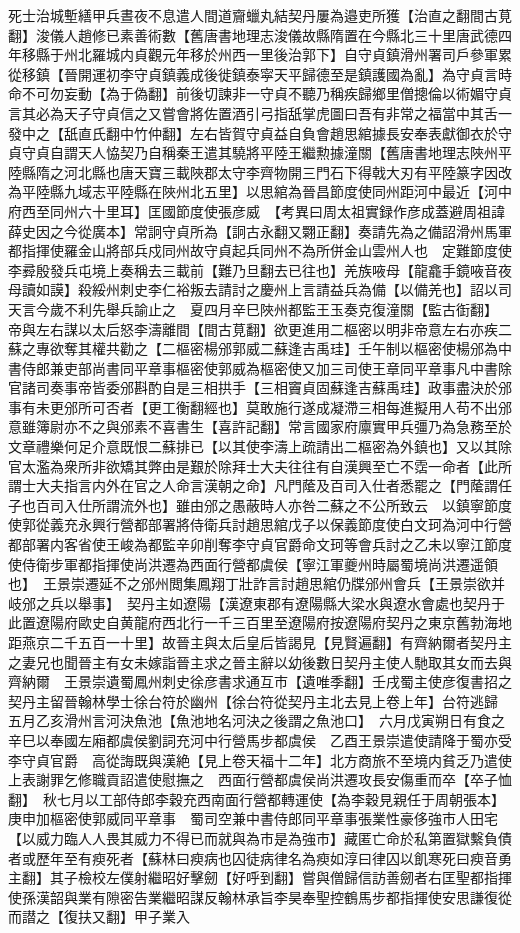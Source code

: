 死士治城塹繕甲兵晝夜不息遣人間道齎蠟丸結契丹屢為邉吏所獲【治直之翻間古莧翻】浚儀人趙修已素善術數【舊唐書地理志浚儀故縣隋置在今縣北三十里唐武德四年移縣于州北羅城内貞觀元年移於州西一里後治郭下】自守貞鎮滑州署司戶參軍累從移鎮【晉開運初李守貞鎮義成後徙鎮泰寜天平歸德至是鎮護國為亂】為守貞言時命不可勿妄動【為于偽翻】前後切諫非一守貞不聽乃稱疾歸鄉里僧摠倫以術媚守貞言其必為天子守貞信之又嘗會將佐置酒引弓指舐掌虎圖曰吾有非常之福當中其舌一發中之【舐直氏翻中竹仲翻】左右皆賀守貞益自負會趙思綰據長安奉表獻御衣於守貞守貞自謂天人恊契乃自稱秦王遣其驍將平陸王繼勲據潼關【舊唐書地理志陜州平陸縣隋之河北縣也唐天寶三載陜郡太守李齊物開三門石下得戟大刃有平陸篆字因改為平陸縣九域志平陸縣在陜州北五里】以思綰為晉昌節度使同州距河中最近【河中府西至同州六十里耳】匡國節度使張彦威　【考異曰周太祖實録作彦成蓋避周祖諱薛史因之今從廣本】常詗守貞所為【詗古永翻又翾正翻】奏請先為之備詔滑州馬軍都指揮使羅金山將部兵戍同州故守貞起兵同州不為所併金山雲州人也　定難節度使李彛殷發兵屯境上奏稱去三載前【難乃旦翻去已往也】羌族㖡母【龍龕手鏡㖡音夜母讀如謨】殺綏州刺史李仁裕叛去請討之慶州上言請益兵為備【以備羌也】詔以司天言今歲不利先舉兵諭止之　夏四月辛巳陜州都監王玉奏克復潼關【監古衘翻】　帝與左右謀以太后怒李濤離間【間古莧翻】欲更進用二樞密以明非帝意左右亦疾二蘇之專欲奪其權共勸之【二樞密楊邠郭威二蘇逢吉禹珪】壬午制以樞密使楊邠為中書侍郎兼吏部尚書同平章事樞密使郭威為樞密使又加三司使王章同平章事凡中書除官諸司奏事帝皆委邠斟酌自是三相拱手【三相竇貞固蘇逢吉蘇禹珪】政事盡決於邠事有未更邠所可否者【更工衡翻經也】莫敢施行遂成凝滯三相每進擬用人苟不出邠意雖簿尉亦不之與邠素不喜書生【喜許記翻】常言國家府廪實甲兵彊乃為急務至於文章禮樂何足介意既恨二蘇排已【以其使李濤上疏請出二樞密為外鎮也】又以其除官太濫為衆所非欲矯其弊由是艱於除拜士大夫往往有自漢興至亡不霑一命者【此所謂士大夫指言内外在官之人命言漢朝之命】凡門䕃及百司入仕者悉罷之【門䕃謂任子也百司入仕所謂流外也】雖由邠之愚蔽時人亦咎二蘇之不公所致云　以鎮寧節度使郭從義充永興行營都部署將侍衛兵討趙思綰戊子以保義節度使白文珂為河中行營都部署内客省使王峻為都監辛卯削奪李守貞官爵命文珂等會兵討之乙未以寧江節度使侍衛步軍都指揮使尚洪遷為西面行營都虞侯【寧江軍夔州時屬蜀境尚洪遷遥領也】　王景崇遷延不之邠州閲集鳳翔丁壯詐言討趙思綰仍牒邠州會兵【王景崇欲并岐邠之兵以舉事】　契丹主如遼陽【漢遼東郡有遼陽縣大梁水與遼水會處也契丹于此置遼陽府歐史自黄龍府西北行一千三百里至遼陽府按遼陽府契丹之東京舊勃海地距燕京二千五百一十里】故晉主與太后皇后皆謁見【見賢遍翻】有齊納爾者契丹主之妻兄也聞晉主有女未嫁詣晉主求之晉主辭以幼後數日契丹主使人馳取其女而去與齊納爾　王景崇遺蜀鳳州刺史徐彦書求通互市【遺唯季翻】壬戌蜀主使彦復書招之契丹主留晉翰林學士徐台符於幽州【徐台符從契丹主北去見上卷上年】台符逃歸　五月乙亥滑州言河決魚池【魚池地名河決之後謂之魚池口】　六月戊寅朔日有食之　辛巳以奉國左廂都虞侯劉詞充河中行營馬步都虞侯　乙酉王景崇遣使請降于蜀亦受李守貞官爵　高從誨既與漢絶【見上卷天福十二年】北方商旅不至境内貧乏乃遣使上表謝罪乞修職貢詔遣使慰撫之　西面行營都虞侯尚洪遷攻長安傷重而卒【卒子恤翻】　秋七月以工部侍郎李穀充西南面行營都轉運使【為李穀見親任于周朝張本】庚申加樞密使郭威同平章事　蜀司空兼中書侍郎同平章事張業性豪侈強市人田宅【以威力臨人人畏其威力不得已而就與為市是為強市】藏匿亡命於私第置獄繫負債者或歷年至有瘐死者【蘇林曰瘐病也囚徒病律名為瘐如淳曰律囚以飢寒死曰瘐音勇主翻】其子檢校左僕射繼昭好擊劒【好呼到翻】嘗與僧歸信訪善劒者右匡聖都指揮使孫漢韶與業有隙密告業繼昭謀反翰林承旨李昊奉聖控鶴馬步都指揮使安思謙復從而譛之【復扶又翻】甲子業入